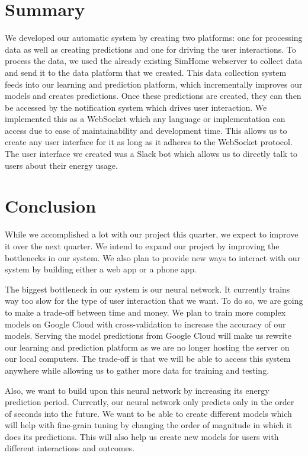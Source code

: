 \documentclass[conference]{IEEEtran}
\begin{document}
\section*{Summary}
We developed our automatic system by creating two platforms: one for processing data as well as creating predictions and one for driving the user interactions. To process the data, we used the already existing SimHome webserver to collect data and send it to the data platform that we created. This data collection system feeds into our learning and prediction platform, which incrementally improves our models and creates predictions. Once these predictions are created, they can then be accessed by the notification system which drives user interaction. We implemented this as a WebSocket which any language or implementation can access due to ease of maintainability and development time. This allows us to create any user interface for it as long as it adheres to the WebSocket protocol. The user interface we created was a Slack bot which allows us to directly talk to users about their energy usage.

\section*{Conclusion}
While we accomplished a lot with our project this quarter, we expect to improve it over the next quarter. We intend to expand our project by improving the bottlenecks in our system. We also plan to provide new ways to interact with our system by building either a web app or a phone app.

The biggest bottleneck in our system is our neural network. It currently trains way too slow for the type of user interaction that we want. To do so, we are going to make a trade-off between time and money. We plan to train more complex models on Google Cloud with cross-validation to increase the accuracy of our models. Serving the model predictions from Google Cloud will make us rewrite our learning and prediction platform as we are no longer hosting the server on our local computers. The trade-off is that we will be able to access this system anywhere while allowing us to gather more data for training and testing.

Also, we want to build upon this neural network by increasing its energy prediction period. Currently, our neural network only predicts only in the order of seconds into the future. We want to be able to create different models which will help with fine-grain tuning by changing the order of magnitude in which it does its predictions. This will also help us create new models for users with different interactions and outcomes.
\end{document}
